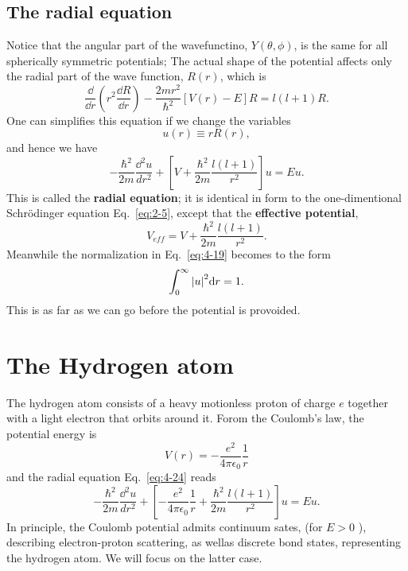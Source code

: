 \subsection{The radial equation}
Notice that the angular part of the wavefunctino, $Y \left( \theta,\phi \right)$, is the same for all spherically symmetric potentials;
The actual shape of the potential affects only the radial part of the wave function, $R \left( r \right)$, which is
\begin{equation}
  \label{eq:4-22}
  \frac{\dd }{\dd r} \left( r^2 \frac{\dd R}{\dd r} \right) - \frac{2mr^{2}}{\hbar^{2}} \left[ V \left( r \right) - E \right] R = l \left( l+1 \right) R.
\end{equation}
One can simplifies this equation if we change the variables
\begin{equation}
  \label{eq:4-23}
  u \left( r \right)  \equiv r R \left( r \right) ,
\end{equation}
and hence we have
\begin{equation}
  \label{eq:4-24}
  - \frac{\hbar^{2}}{2m} \frac{\dd^{2} u}{d r^2} + \left[ V + \frac{\hbar^{2}}{2m} \frac{l \left( l+1 \right)}{r^2} \right] u = Eu.
\end{equation}
This is called the \textbf{radial equation}; it is identical in form to the one-dimentional Schr\"odinger equation Eq.~\eqref{eq:2-5}, except that the \textbf{effective potential},
\begin{equation}
  \label{eq:4-25}
  V_{eff} = V + \frac{\hbar^{2}}{2m} \frac{l \left( l+1 \right)}{r^{2}}.
\end{equation}
Meanwhile the normalization in Eq.~\eqref{eq:4-19} becomes to the form
\begin{equation}
  \label{eq:4-26}
  \int_0^{\infty} \abs{u}^2 \dd r = 1.
\end{equation}
This is as far as we can go before the potential is provoided.

\section{The Hydrogen atom}
The hydrogen atom consists of a heavy motionless proton of charge $e$ together with a light electron that orbits around it.
Forom the Coulomb's law, the potential energy is
\begin{equation}
  \label{eq:4-27}
  V \left( r \right) = - \frac{e^{2}}{4\pi \epsilon_{0}} \frac{1}{r}
\end{equation}
and the radial equation Eq.~\eqref{eq:4-24} reads
\begin{equation}
  \label{eq:4-28}
  - \frac{\hbar^{2}}{2m} \frac{\dd^{2} u}{d r^2} + \left[ - \frac{e^{2}}{4\pi \epsilon_{0}} \frac{1}{r} + \frac{\hbar^{2}}{2m} \frac{l \left( l+1 \right)}{r^2} \right] u = Eu.
\end{equation}
In principle, the Coulomb potential admits continuum sates, (for $ E>0 $ ), describing electron-proton scattering, as wellas discrete bond states, representing the hydrogen atom.
We will focus on the latter case.

